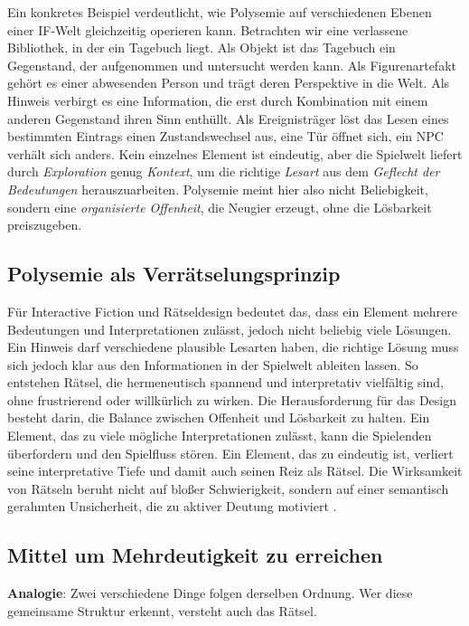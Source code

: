 \documentclass[parskip=half,a4paper,11pt]{scrreprt}
\begin{document}
Ein konkretes Beispiel verdeutlicht, wie Polysemie auf verschiedenen Ebenen einer IF-Welt gleichzeitig operieren kann. Betrachten wir eine verlassene Bibliothek, in der ein Tagebuch liegt. Als Objekt ist das Tagebuch ein Gegenstand, der aufgenommen und untersucht werden kann. Als Figurenartefakt gehört es einer abwesenden Person und trägt deren Perspektive in die Welt. Als Hinweis verbirgt es eine Information, die erst durch Kombination mit einem anderen Gegenstand ihren Sinn enthüllt. Als Ereignisträger löst das Lesen eines bestimmten Eintrags einen Zustandswechsel aus, eine Tür öffnet sich, ein NPC verhält sich anders. Kein einzelnes Element ist eindeutig, aber die Spielwelt liefert durch \textit{Exploration} genug \textit{Kontext}, um die richtige\textit{ Lesart} aus dem \textit{Geflecht der Bedeutungen} herauszuarbeiten. Polysemie meint hier also nicht Beliebigkeit, sondern eine \textit{organisierte Offenheit}, die Neugier erzeugt, ohne die Lösbarkeit preiszugeben.

\subsection{Polysemie als Verrätselungsprinzip}

Für Interactive Fiction und Rätseldesign bedeutet das, dass ein Element mehrere Bedeutungen und Interpretationen zulässt, jedoch nicht beliebig viele Lösungen. Ein Hinweis darf verschiedene plausible Lesarten haben, die richtige Lösung muss sich jedoch klar aus den Informationen in der Spielwelt ableiten lassen. So entstehen Rätsel, die hermeneutisch spannend und interpretativ vielfältig sind, ohne frustrierend oder willkürlich zu wirken. Die Herausforderung für das Design besteht darin, die Balance zwischen Offenheit und Lösbarkeit zu halten. Ein Element, das zu viele mögliche Interpretationen zulässt, kann die Spielenden überfordern und den Spielfluss stören. Ein Element, das zu eindeutig ist, verliert seine interpretative Tiefe und damit auch seinen Reiz als Rätsel. Die Wirksamkeit von Rätseln beruht nicht auf bloßer Schwierigkeit, sondern auf einer semantisch gerahmten Unsicherheit, die zu aktiver Deutung motiviert \citep{Danesi2002}.

\subsection{Mittel um Mehrdeutigkeit zu erreichen}

\textbf{Analogie}: Zwei verschiedene Dinge folgen derselben Ordnung. Wer diese gemeinsame Struktur erkennt, versteht auch das Rätsel. 
\end{document}
